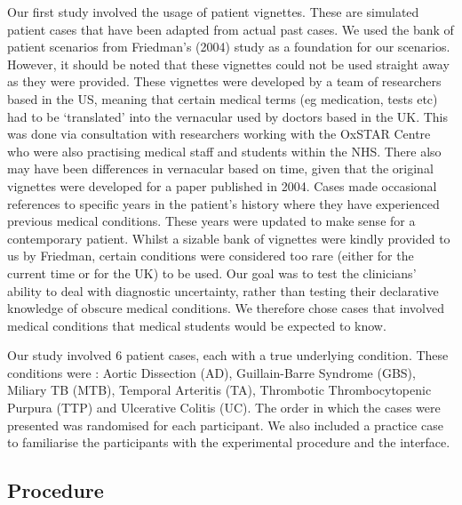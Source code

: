 \documentclass[a4paper, nobind]{templates/ociamthesis}
\begin{document}
Our first study involved the usage of patient vignettes. These are simulated patient cases that have been adapted from actual past cases. We used the bank of patient scenarios from Friedman's (2004) study as a foundation for our scenarios. However, it should be noted that these vignettes could not be used straight away as they were provided. These vignettes were developed by a team of researchers based in the US, meaning that certain medical terms (eg medication, tests etc) had to be `translated' into the vernacular used by doctors based in the UK. This was done via consultation with researchers working with the OxSTAR Centre who were also practising medical staff and students within the NHS. There also may have been differences in vernacular based on time, given that the original vignettes were developed for a paper published in 2004. Cases made occasional references to specific years in the patient's history where they have experienced previous medical conditions. These years were updated to make sense for a contemporary patient. Whilst a sizable bank of vignettes were kindly provided to us by Friedman, certain conditions were considered too rare (either for the current time or for the UK) to be used. Our goal was to test the clinicians' ability to deal with diagnostic uncertainty, rather than testing their declarative knowledge of obscure medical conditions. We therefore chose cases that involved medical conditions that medical students would be expected to know.

Our study involved 6 patient cases, each with a true underlying condition. These conditions were : Aortic Dissection (AD), Guillain-Barre Syndrome (GBS), Miliary TB (MTB), Temporal Arteritis (TA), Thrombotic Thrombocytopenic Purpura (TTP) and Ulcerative Colitis (UC). The order in which the cases were presented was randomised for each participant. We also included a practice case to familiarise the participants with the experimental procedure and the interface.

\hypertarget{procedure}{%
\subsection*{Procedure}\label{procedure}}
\end{document}
